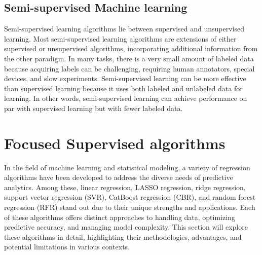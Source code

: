 \documentclass{book}
\numberwithin{equation}{section}
\numberwithin{figure}{section}
\begin{document}
\subsection{Semi-supervised Machine learning}
\label{semi supervised}
Semi-supervised learning algorithms lie between supervised and unsupervised learning. Most semi-supervised learning algorithms are extensions of either supervised or unsupervised algorithms, incorporating additional information from the other paradigm. In many tasks, there is a very small amount of labeled data because acquiring labels can be challenging, requiring human annotators, special devices, and slow experiments. Semi-supervised learning can be more effective than supervised learning because it uses both labeled and unlabeled data for learning. In other words, semi-supervised learning can achieve performance on par with supervised learning but with fewer labeled data.
\section{Focused Supervised algorithms}
\label{focused}
In the field of machine learning and statistical modeling, a variety of regression algorithms have been developed to address the diverse needs of predictive analytics. Among these, linear regression, LASSO regression, ridge regression, support vector regression (SVR), CatBoost regression (CBR), and random forest regression (RFR) stand out due to their unique strengths and applications. Each of these algorithms offers distinct approaches to handling data, optimizing predictive accuracy, and managing model complexity. This section will explore these algorithms in detail, highlighting their methodologies, advantages, and potential limitations in various contexts.
\vspace{-5mm} %
\end{document}
